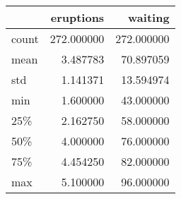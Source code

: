 \begin{tabular}{lrr}
\toprule
{} &   eruptions &     waiting \\
\midrule
count &  272.000000 &  272.000000 \\
mean  &    3.487783 &   70.897059 \\
std   &    1.141371 &   13.594974 \\
min   &    1.600000 &   43.000000 \\
25\%   &    2.162750 &   58.000000 \\
50\%   &    4.000000 &   76.000000 \\
75\%   &    4.454250 &   82.000000 \\
max   &    5.100000 &   96.000000 \\
\bottomrule
\end{tabular}
